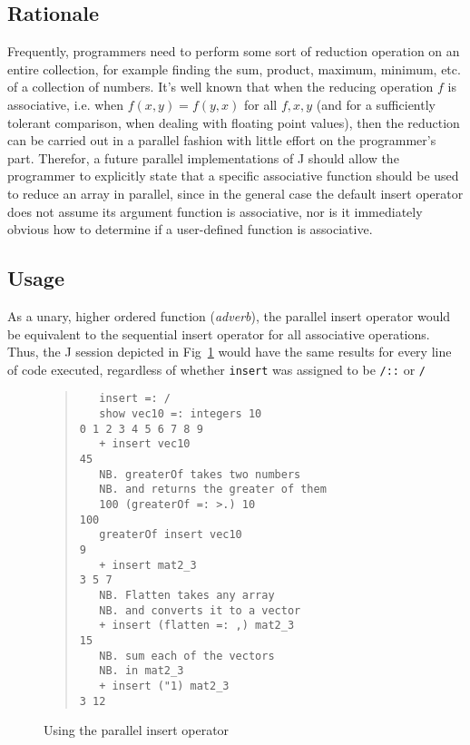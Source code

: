 \subsection{Rationale}
Frequently, programmers need to perform some sort of reduction operation on an entire collection, 
for example finding the sum, product, maximum, minimum, etc. of a collection of numbers.
It's well known that when the reducing operation $f$ is associative, 
i.e. when $f(x,y) = f(y,x)$ for all $f, x, y$ (and for a sufficiently tolerant comparison, when dealing with floating point values),
then the reduction can be carried out in a parallel fashion with little effort on the programmer's part.
Therefor, a future parallel implementations of J should allow the programmer 
to explicitly state that a specific associative function should be used to reduce an array in parallel, 
since in the general case the default insert operator does not assume its argument function is associative, 
nor is it immediately obvious how to determine if a user-defined function is associative.

\subsection{Usage}
As a unary, higher ordered function (\textit{adverb}), 
the parallel insert operator would be equivalent to the sequential insert operator 
for all associative operations. 
Thus, the J session depicted in Fig~\ref{fig::pinsert} would have the same results for every line of code executed, 
regardless of whether \texttt{insert} was assigned to be \texttt{/::} or \texttt{/}

\begin{figure}[h]
\begin{quote}
\begin{singlespacing}
\begin{small}
\begin{verbatim}
   insert =: /
   show vec10 =: integers 10
0 1 2 3 4 5 6 7 8 9
   + insert vec10
45
   NB. greaterOf takes two numbers
   NB. and returns the greater of them
   100 (greaterOf =: >.) 10
100
   greaterOf insert vec10
9
   + insert mat2_3
3 5 7
   NB. Flatten takes any array
   NB. and converts it to a vector
   + insert (flatten =: ,) mat2_3
15
   NB. sum each of the vectors
   NB. in mat2_3
   + insert ("1) mat2_3
3 12
\end{verbatim}
\end{small}
\end{singlespacing}
\end{quote}
\label{fig::pinsert}
\caption{Using the parallel insert operator}
\end{figure}

